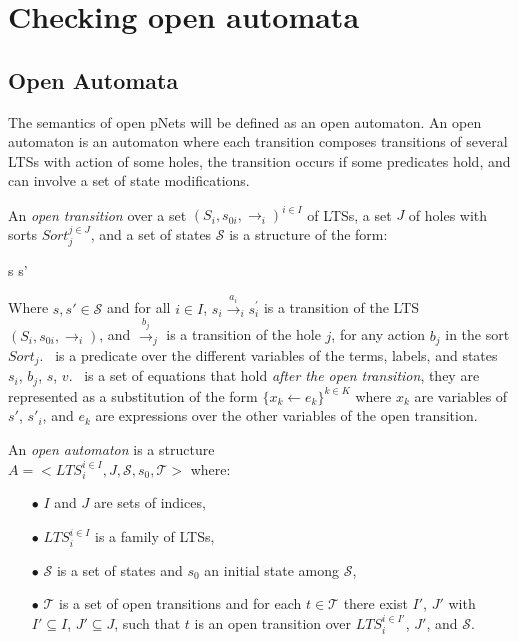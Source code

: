 \documentclass[runningheads,a4paper]{llncs}
\begin{document}
\section{Checking open automata}


\subsection{Open Automata}

The semantics of open pNets will be defined  as an open automaton. An open
automaton is an automaton where each transition composes transitions of several LTSs with action of some holes, the transition occurs if some predicates hold, and can involve a set of state modifications.

\begin{definition}
	\label{def:OpenTransitions}
	An \emph{open transition} over a set  $(S_i,s_{0 i}, \rightarrow_i)^{i\in
	I}$ of LTSs, a
	set $J$ of holes with sorts $Sort_j^{j\in J}$, and a set of states $\mathcal{S}$ is a structure of the form:	
	\begin{mathpar}
	{s s'}
	\end{mathpar}
	Where $s, s'\in\mathcal{S}$ and for all
        $i\in I$, $s_i{\xrightarrow{a_i}}_i s_i^{\prime}$ is a transition of the
	LTS $(S_i,s_{0 i}, \rightarrow_i)$, and $\xrightarrow{b_j}_j$
        is a transition of the hole $j$, for any action $b_j$ in the
        sort $Sort_j$. \Pred\ is a predicate
	over the different variables of the
	terms, labels, and states $s_i$, $b_j$, $s$, $v$. \Post\ is a set of equations that 
	hold \emph{after the open transition}, they are represented as a substitution of the 
	form $\{x_k\gets e_k\}^{k\in K}$ 
	where $x_k$ are variables of $s'$, $s'_i$, and $e_k$ are expressions over the other 
	variables of the open transition.
\end{definition}


\begin{definition}
	\label{def:open-automaton}
	An \emph{open automaton} is a structure\\ $A =
	<LTS_i^{i\in I},J,\mathcal{S},s_0,\mathcal{T}>$ where:
	\begin{itemize}
		\item[$\bullet$]  $I$ and $J$ are  sets of indices,
		\item[$\bullet$]  $LTS_i^{i\in I}$ is a family of LTSs,
		\item[$\bullet$]   $\mathcal{S}$ is a set of states and $s_0$ an initial state
		among $\mathcal{S}$,
		\item[$\bullet$] $\mathcal{T}$ is a set of open transitions and for each
		$t\in \mathcal{T}$ there exist $I'$, $J'$ with $I'\subseteq I$, $J'
		\subseteq J$, such that $t$ is an open transition over $LTS_i^{i\in I'}$, $J'$,
		and  $\mathcal{S}$.
		
	\end{itemize}
\end{definition}
	
\end{document}
